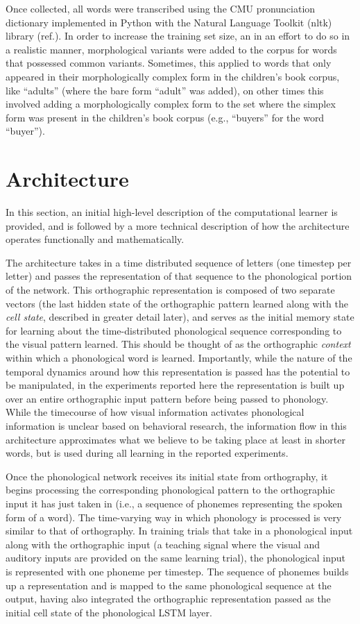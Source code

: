 \documentclass[
  american,
  man,floatsintext]{apa6}
\begin{document}
Once collected, all words were transcribed using the CMU pronunciation dictionary implemented in Python with the Natural Language Toolkit (nltk) library (ref.). In order to increase the training set size, an in an effort to do so in a realistic manner, morphological variants were added to the corpus for words that possessed common variants. Sometimes, this applied to words that only appeared in their morphologically complex form in the children's book corpus, like ``adults'' (where the bare form ``adult'' was added), on other times this involved adding a morphologically complex form to the set where the simplex form was present in the children's book corpus (e.g., ``buyers'' for the word ``buyer'').

\hypertarget{architecture}{%
\section{Architecture}\label{architecture}}

In this section, an initial high-level description of the computational learner is provided, and is followed by a more technical description of how the architecture operates functionally and mathematically.

The architecture takes in a time distributed sequence of letters (one timestep per letter) and passes the representation of that sequence to the phonological portion of the network. This orthographic representation is composed of two separate vectors (the last hidden state of the orthographic pattern learned along with the \emph{cell state}, described in greater detail later), and serves as the initial memory state for learning about the time-distributed phonological sequence corresponding to the visual pattern learned. This should be thought of as the orthographic \emph{context} within which a phonological word is learned. Importantly, while the nature of the temporal dynamics around how this representation is passed has the potential to be manipulated, in the experiments reported here the representation is built up over an entire orthographic input pattern before being passed to phonology. While the timecourse of how visual information activates phonological information is unclear based on behavioral research, the information flow in this architecture approximates what we believe to be taking place at least in shorter words, but is used during all learning in the reported experiments.

Once the phonological network receives its initial state from orthography, it begins processing the corresponding phonological pattern to the orthographic input it has just taken in (i.e., a sequence of phonemes representing the spoken form of a word). The time-varying way in which phonology is processed is very similar to that of orthography. In training trials that take in a phonological input along with the orthographic input (a teaching signal where the visual and auditory inputs are provided on the same learning trial), the phonological input is represented with one phoneme per timestep. The sequence of phonemes builds up a representation and is mapped to the same phonological sequence at the output, having also integrated the orthographic representation passed as the initial cell state of the phonological LSTM layer.
\end{document}
